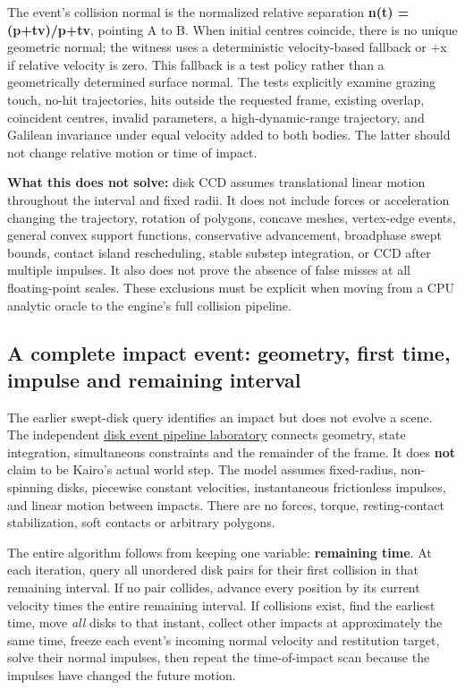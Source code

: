 The event's collision normal is the normalized relative separation \textbf{n(t) = (p+tv)/\textbar p+tv\textbar{}}, pointing A to B. When initial centres coincide, there is no unique geometric normal; the witness uses a deterministic velocity-based fallback or +x if relative velocity is zero. This fallback is a test policy rather than a geometrically determined surface normal. The tests explicitly examine grazing touch, no-hit trajectories, hits outside the requested frame, existing overlap, coincident centres, invalid parameters, a high-dynamic-range trajectory, and Galilean invariance under equal velocity added to both bodies. The latter should not change relative motion or time of impact.

\textbf{What this does not solve:} disk CCD assumes translational linear motion throughout the interval and fixed radii. It does not include forces or acceleration changing the trajectory, rotation of polygons, concave meshes, vertex-edge events, general convex support functions, conservative advancement, broadphase swept bounds, contact island rescheduling, stable substep integration, or CCD after multiple impulses. It also does not prove the absence of false misses at all floating-point scales. These exclusions must be explicit when moving from a CPU analytic oracle to the engine's full collision pipeline.

\subsection{A complete impact event: geometry, first time, impulse and remaining interval}\label{appendix-c9d92e145503-a-complete-impact-event-geometry-first-time-impulse-and-remaining-interval}

\hypertarget{appendix-c9d92e145503-a-complete-impact-event-geometry-first-time-impulse-and-remaining-interval}{}

The earlier swept-disk query identifies an impact but does not evolve a scene. The independent \hyperref[source-file-ad26f703e8f150d27a72bf93]{disk event pipeline laboratory} connects geometry, state integration, simultaneous constraints and the remainder of the frame. It does \textbf{not} claim to be Kairo's actual world step. The model assumes fixed-radius, non-spinning disks, piecewise constant velocities, instantaneous frictionless impulses, and linear motion between impacts. There are no forces, torque, resting-contact stabilization, soft contacts or arbitrary polygons.

The entire algorithm follows from keeping one variable: \textbf{remaining time}. At each iteration, query all unordered disk pairs for their first collision in that remaining interval. If no pair collides, advance every position by its current velocity times the entire remaining interval. If collisions exist, find the earliest time, move \emph{all} disks to that instant, collect other impacts at approximately the same time, freeze each event's incoming normal velocity and restitution target, solve their normal impulses, then repeat the time-of-impact scan because the impulses have changed the future motion.

